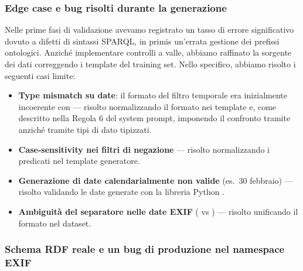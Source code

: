 \subsubsection{Edge case e bug risolti durante la generazione}\label{subsec:edge_cases_generazione}

Nelle prime fasi di validazione avevamo registrato un tasso di errore significativo dovuto a difetti di sintassi SPARQL, in primis un'errata gestione dei prefissi ontologici. Anziché implementare controlli a valle, abbiamo raffinato la sorgente dei dati correggendo i template del training set. Nello specifico, abbiamo risolto i seguenti casi limite:

\begin{itemize}
  \item \textbf{Type mismatch su date}: il formato del filtro temporale era inizialmente incoerente con  --- risolto normalizzando il formato nei template e, come descritto nella Regola 6 del system prompt, imponendo il confronto tramite  anziché tramite tipi di dato tipizzati.
  \item \textbf{Case-sensitivity nei filtri di negazione} --- risolto normalizzando i predicati nel template generatore.
  \item \textbf{Generazione di date calendarialmente non valide} (es.\ 30 febbraio) --- risolto validando le date generate con la libreria Python .
  \item \textbf{Ambiguità del separatore nelle date EXIF} (\code{:} vs \code{-}) --- risolto unificando il formato nel dataset.
\end{itemize}

\subsubsection{Schema RDF reale e un bug di produzione nel namespace EXIF}\label{subsec:bug_exif_namespace}


